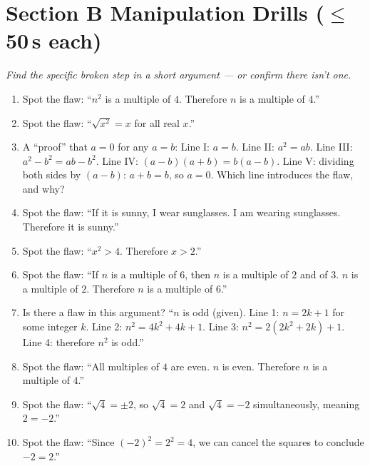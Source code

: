 \documentclass[11pt,a4paper]{article}
\begin{document}
\section*{Section B \quad Manipulation Drills \hfill{\normalfont\small($\leq$50\,s each)}}

\noindent\textit{Find the specific broken step in a short argument --- or confirm there isn't one.}

\begin{enumerate}

\item Spot the flaw: ``$n^2$ is a multiple of $4$. Therefore $n$ is a multiple of $4$.''

\item Spot the flaw: ``$\sqrt{x^2}=x$ for all real $x$.''

\item A ``proof'' that $a=0$ for any $a=b$: Line I: $a=b$. Line II: $a^2=ab$. Line III: $a^2-b^2=ab-b^2$. Line IV: $(a-b)(a+b)=b(a-b)$. Line V: dividing both sides by $(a-b)$: $a+b=b$, so $a=0$. Which line introduces the flaw, and why?

\item Spot the flaw: ``If it is sunny, I wear sunglasses. I am wearing sunglasses. Therefore it is sunny.''

\item Spot the flaw: ``$x^2>4$. Therefore $x>2$.''

\item Spot the flaw: ``If $n$ is a multiple of $6$, then $n$ is a multiple of $2$ and of $3$. $n$ is a multiple of $2$. Therefore $n$ is a multiple of $6$.''

\item Is there a flaw in this argument? ``$n$ is odd (given). Line 1: $n=2k+1$ for some integer $k$. Line 2: $n^2=4k^2+4k+1$. Line 3: $n^2=2(2k^2+2k)+1$. Line 4: therefore $n^2$ is odd.''

\item Spot the flaw: ``All multiples of $4$ are even. $n$ is even. Therefore $n$ is a multiple of $4$.''

\item Spot the flaw: ``$\sqrt4=\pm2$, so $\sqrt4=2$ and $\sqrt4=-2$ simultaneously, meaning $2=-2$.''

\item Spot the flaw: ``Since $(-2)^2=2^2=4$, we can cancel the squares to conclude $-2=2$.''

\end{enumerate}
\end{document}
